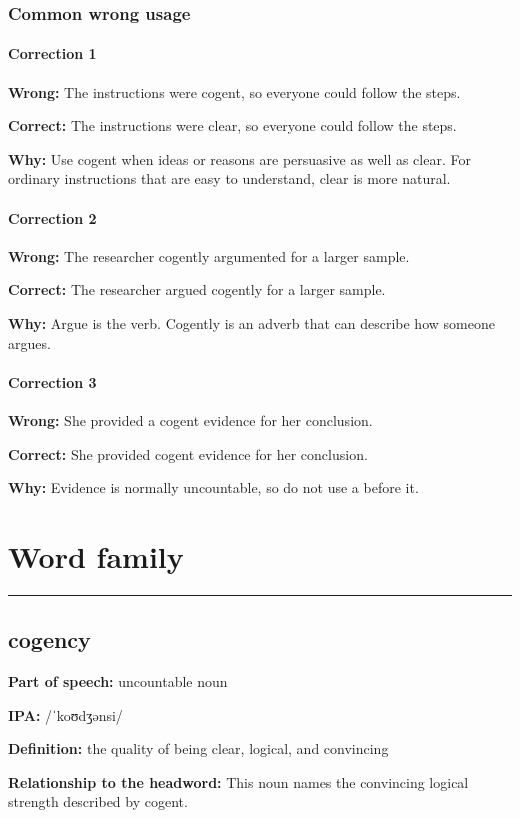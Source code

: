 \documentclass[11pt]{article}
\newcommand{\sectionrule}{\par\vspace{-0.5em}\noindent\textcolor{Accent}{\rule{\linewidth}{0.6pt}}\par}
\begin{document}
\subsubsection{Common wrong usage}
\paragraph{Correction 1}
\textbf{Wrong:} The instructions were cogent, so everyone could follow the steps.

\textbf{Correct:} The instructions were clear, so everyone could follow the steps.

\textbf{Why:} Use cogent when ideas or reasons are persuasive as well as clear. For ordinary instructions that are easy to understand, clear is more natural.

\paragraph{Correction 2}
\textbf{Wrong:} The researcher cogently argumented for a larger sample.

\textbf{Correct:} The researcher argued cogently for a larger sample.

\textbf{Why:} Argue is the verb. Cogently is an adverb that can describe how someone argues.

\paragraph{Correction 3}
\textbf{Wrong:} She provided a cogent evidence for her conclusion.

\textbf{Correct:} She provided cogent evidence for her conclusion.

\textbf{Why:} Evidence is normally uncountable, so do not use a before it.

\section{Word family}
\sectionrule
\subsection{cogency}
\textbf{Part of speech:} uncountable noun

\textbf{IPA:} /ˈkoʊdʒənsi/

\textbf{Definition:} the quality of being clear, logical, and convincing

\textbf{Relationship to the headword:} This noun names the convincing logical strength described by cogent.
\end{document}
